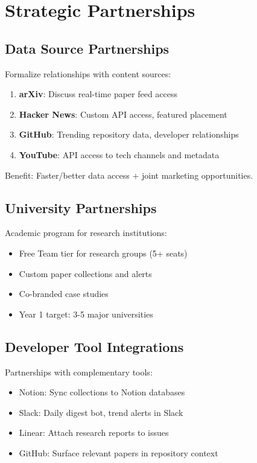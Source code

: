\documentclass{report}
\begin{document}
\section{Strategic Partnerships}

\subsection{Data Source Partnerships}

Formalize relationships with content sources:

\begin{enumerate}
    \item \textbf{arXiv}: Discuss real-time paper feed access
    \item \textbf{Hacker News}: Custom API access, featured placement
    \item \textbf{GitHub}: Trending repository data, developer relationships
    \item \textbf{YouTube}: API access to tech channels and metadata
\end{enumerate}

Benefit: Faster/better data access + joint marketing opportunities.

\subsection{University Partnerships}

Academic program for research institutions:

\begin{itemize}
    \item Free Team tier for research groups (5+ seats)
    \item Custom paper collections and alerts
    \item Co-branded case studies
    \item Year 1 target: 3-5 major universities
\end{itemize}

\subsection{Developer Tool Integrations}

Partnerships with complementary tools:

\begin{itemize}
    \item Notion: Sync collections to Notion databases
    \item Slack: Daily digest bot, trend alerts in Slack
    \item Linear: Attach research reports to issues
    \item GitHub: Surface relevant papers in repository context
\end{itemize}
\end{document}
